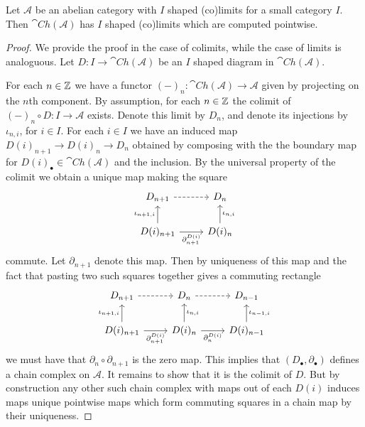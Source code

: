 \begin{lem}[label=lem:computecoLim]
    Let $\mathcal{A}$ be an abelian category with $I$ shaped (co)limits for a small category $I$. Then $\cat{Ch}(\mathcal{A})$ has $I$ shaped (co)limits which are computed pointwise.
\end{lem}
\begin{proof}
    We provide the proof in the case of colimits, while the case of limits is analoguous. Let $D:I\to \cat{Ch}(\mathcal{A})$ be an $I$ shaped diagram in $\cat{Ch}(\mathcal{A})$. 
    
    
    For each $n \in \mathbb Z$ we have a functor $(-)_n:\cat{Ch}(\mathcal{A})\to \mathcal{A}$ given by projecting on the $n$th component. By assumption, for each $n \in \mathbb Z$ the colimit of $(-)_n\circ D:I\to \mathcal{A}$ exists. Denote this limit by $D_n$, and denote its injections by $\iota_{n,i}$, for $i \in I$. For each $i \in I$ we have an induced map $D(i)_{n+1}\to D(i)_n \to D_n$ obtained by composing with the the boundary map for $D(i)_\bullet \in \cat{Ch}(\mathcal{A})$ and the inclusion. By the universal property of the colimit we obtain a unique map making the square
    \[\begin{tikzcd}
    	{D_{n+1}} & {D_n} \\
    	{D(i)_{n+1}} & {D(i)_n}
    	\arrow["{\partial^{D(i)}_{n+1}}"', from=2-1, to=2-2]
    	\arrow[dashed, from=1-1, to=1-2]
    	\arrow["{\iota_{n+1,i}}", from=2-1, to=1-1]
    	\arrow["{\iota_{n,i}}"', from=2-2, to=1-2]
    \end{tikzcd}\]
    commute. Let $\partial_{n+1}$ denote this map. Then by uniqueness of this map and the fact that pasting two such squares together gives a commuting rectangle
    \[\begin{tikzcd}
    	{D_{n+1}} & {D_n} & {D_{n-1}} \\
    	{D(i)_{n+1}} & {D(i)_n} & {D(i)_{n-1}}
    	\arrow["{\partial^{D(i)}_{n+1}}"', from=2-1, to=2-2]
    	\arrow[dashed, from=1-1, to=1-2]
    	\arrow["{\iota_{n+1,i}}", from=2-1, to=1-1]
    	\arrow["{\iota_{n,i}}"', from=2-2, to=1-2]
    	\arrow["{\partial_n^{D(i)}}"', from=2-2, to=2-3]
    	\arrow["{\iota_{n-1,i}}"', from=2-3, to=1-3]
    	\arrow[dashed, from=1-2, to=1-3]
    \end{tikzcd}\]
    we must have that $\partial_n\circ \partial_{n+1}$ is the zero map. This implies that $(D_\bullet,\partial_\bullet)$ defines a chain complex on $\mathcal{A}$. It remains to show that it is the colimit of $D$. But by construction any other such chain complex with maps out of each $D(i)$ induces maps unique pointwise maps which form commuting squares in a chain map by their uniqueness.
\end{proof}



